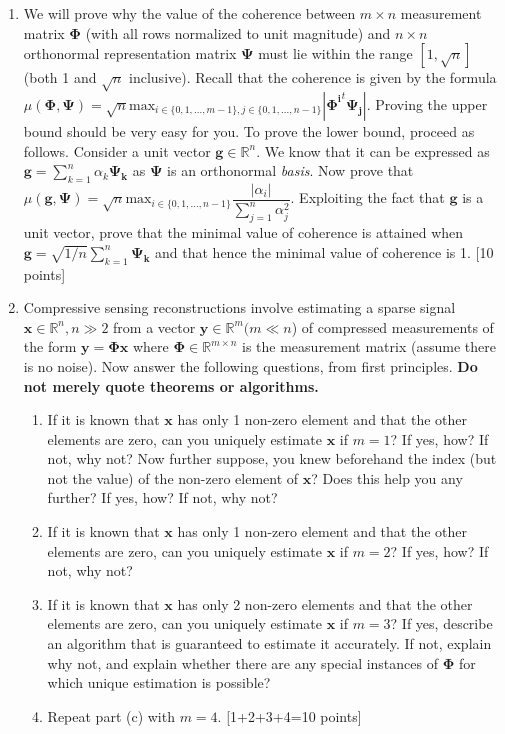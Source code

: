 \documentclass[11pt]{article}
\begin{document}
\begin{enumerate}
\item We will prove why the value of the coherence between $m \times n$ measurement matrix $\boldsymbol{\Phi}$ (with all rows normalized to unit magnitude) and $n \times n$ orthonormal representation matrix $\boldsymbol{\Psi}$ must lie within the range $[1,\sqrt{n}]$ (both 1 and $\sqrt{n}$ inclusive).
Recall that the coherence is given by the formula \\
$\mu(\boldsymbol{\Phi},\boldsymbol{\Psi}) = \sqrt{n} \textrm{max}_{i \in \{0,1,...,m-1\}, j \in \{0,1,...,n-1\}} |\boldsymbol{\Phi^i}^t \boldsymbol{\Psi_j}|$. 
Proving the upper bound should be very easy for you. To prove the lower bound, proceed as follows. Consider a unit vector $\boldsymbol{g} \in \mathbb{R}^n$. We know that it can be expressed as $\boldsymbol{g} = \sum_{k=1}^n \alpha_k \boldsymbol{\Psi_k}$ as $\boldsymbol{\Psi}$ is an orthonormal \emph{basis}. Now prove that $\mu(\boldsymbol{g},\boldsymbol{\Psi}) = \sqrt{n} \textrm{max}_{i \in \{0,1,...,n-1\}} \dfrac{|\alpha_i|}{\sum_{j=1}^n \alpha^2_j}$. Exploiting the fact that $\boldsymbol{g}$ is a unit vector, prove that the minimal value of coherence is attained when $\boldsymbol{g} = \sqrt{1/n} \sum_{k=1}^n \boldsymbol{\Psi_k}$ and that hence the minimal value of coherence is 1. \textsf{[10 points]}

\item Compressive sensing reconstructions involve estimating a sparse signal $\mathbf{x} \in \mathbb{R}^n, n \gg 2$ from a vector $\mathbf{y} \in \mathbb{R}^m (m \ll n$) of compressed measurements of the form $\mathbf{y} = \mathbf{\Phi x}$ where $\mathbf{\Phi} \in \mathbb{R}^{m \times n}$ is the measurement matrix (assume there is no noise). Now answer the following questions, from first principles. \textbf{Do not merely quote theorems or algorithms.}
\begin{enumerate}
\item If it is known that $\mathbf{x}$ has only 1 non-zero element and that the other elements are zero, can you uniquely estimate $\mathbf{x}$ if $m = 1$? If yes, how? If not, why not? Now further suppose, you knew beforehand the index (but not the value) of the non-zero element of $\mathbf{x}$? Does this help you any further? If yes, how? If not, why not?
\item If it is known that $\mathbf{x}$ has only 1 non-zero element and that the other elements are zero, can you uniquely estimate $\mathbf{x}$ if $m = 2$? If yes, how? If not, why not? 
\item If it is known that $\mathbf{x}$ has only 2 non-zero elements and that the other elements are zero, can you uniquely estimate $\mathbf{x}$ if $m = 3$? If yes, describe an algorithm that is guaranteed to estimate it accurately. If not, explain why not, and explain whether there are any special instances of $\mathbf{\Phi}$ for which unique estimation is possible? 
\item Repeat part (c) with $m = 4$.  \textsf{[1+2+3+4=10 points]}
\end{enumerate} 


\end{enumerate}
\end{document}
